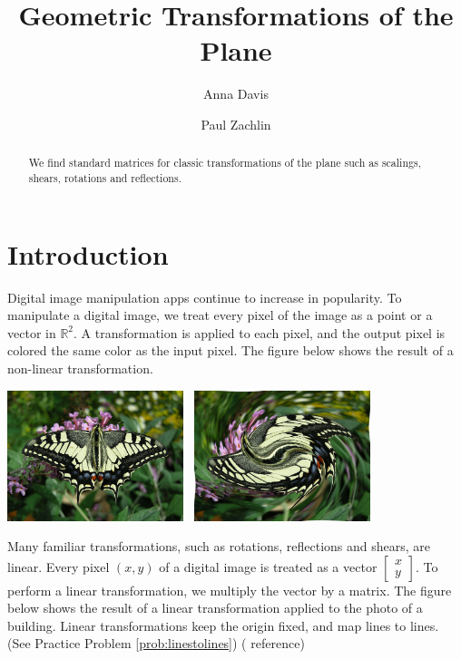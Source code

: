 \documentclass{ximera}
\author{Anna Davis \and Paul Zachlin} \title{Geometric Transformations of the Plane} \license{CC-BY 4.0}
\newcommand{\RR}{\mathbb{R}}
\begin{document}
\begin{abstract}
  We find standard matrices for classic transformations of the plane such as scalings, shears, rotations and reflections.
\end{abstract}
\maketitle

\section*{Introduction}
Digital image manipulation apps continue to increase in popularity.  To manipulate a digital image, we treat every pixel of the image as a point or a vector in $\RR^2$.  A transformation is applied to each pixel, and the output pixel is colored the same color as the input pixel.  The figure below shows the result of a non-linear transformation.

\begin{image}[2in]
\includegraphics[height=1.5in]{butterfly.jpg}~
 \includegraphics[height=1.5in]{swirledbutterfly.jpg}    
\end{image}

Many familiar transformations, such as rotations, reflections and shears, are linear. Every pixel $(x, y)$ of a digital image is treated as a vector $\begin{bmatrix}
x\\
y
\end{bmatrix}$.  To perform a linear transformation, we multiply the vector by a matrix.  The figure below shows the result of a linear transformation applied to the photo of a building.  Linear transformations keep the origin fixed, and map lines to lines. (See Practice Problem \ref{prob:linestolines})  ({\color{red} reference})
\end{document}
